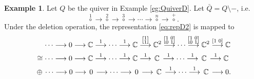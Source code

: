 \documentclass[12pt,reqno]{amsart}
\numberwithin{equation}{section}
\theoremstyle{definition}
\newtheorem{example}[theorem]{Example}
\begin{document}
\begin{example}\label{eg:deletion}
Let $Q$ be the quiver in Example \ref{eg:QuiverD}. 
Let $\bar{Q}=Q\setminus -$, i.e. 
$$\stackrel{1}\circ 
\longrightarrow 
\stackrel{2}\circ 
\longrightarrow 
\stackrel{3}\circ 
\longrightarrow \cdots 
\longrightarrow 
\stackrel{n}\circ
\longrightarrow 
\stackrel{+}\circ.$$
Under the deletion operation, the representation \eqref{eq:repD2} is mapped to 
\begin{equation}\label{eq:deleteofDrep2}
\begin{aligned}
&
\quad \,
\cdots \longrightarrow 0
\longrightarrow \mathbb{C}
\stackrel{1}\longrightarrow\cdots
\stackrel{1}\longrightarrow
\mathbb{C}
\stackrel{\left[\begin{subarray}{c}1\\1
\end{subarray}\right]}\longrightarrow \mathbb{C}^2
\stackrel{\left[\begin{subarray}{c}1\,\,0\\0\,\,1
\end{subarray}\right]}\longrightarrow \cdots 
\stackrel{\left[\begin{subarray}{c}1\,\,0\\0\,\,1
\end{subarray}\right]}\longrightarrow  \mathbb{C}^2
\stackrel{[1\,\,0]}\longrightarrow
\mathbb{C}\\
& \cong 
\cdots \longrightarrow 0
\longrightarrow \mathbb{C}
\stackrel{1}\longrightarrow \cdots
\stackrel{1}\longrightarrow \mathbb{C}
\stackrel{1}\longrightarrow \,\mathbb{C}\,
\stackrel{1}\longrightarrow \cdots
\stackrel{1}\longrightarrow \,\mathbb{C}\,
\stackrel{1}\longrightarrow \mathbb{C}
\\
& \oplus\,
\cdots \longrightarrow 0
\longrightarrow \,0\,
\longrightarrow \cdots
\longrightarrow \,0\,
\longrightarrow \,\mathbb{C}\,
\stackrel{1}\longrightarrow \cdots
\stackrel{1}\longrightarrow \,\mathbb{C}\,
\longrightarrow 0.
\end{aligned}
\end{equation}
\end{example}
\end{document}
